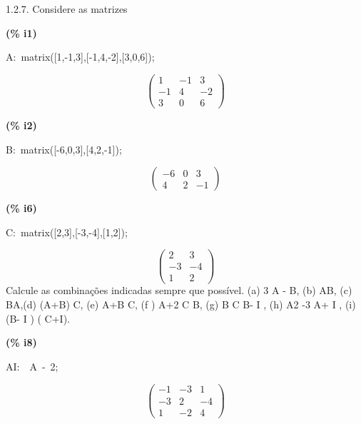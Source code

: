 \documentclass[fleqn]{article}
\begin{document}
1.2.7. Considere as matrizes


\noindent
\begin{minipage}[t]{4.000000em}\color{red}\bfseries
(\% i1)	
\end{minipage}
\begin{minipage}[t]{\textwidth}\color{blue}
A:\ matrix([1,-1,3],[-1,4,-2],[3,0,6]);
\end{minipage}
\[\displaystyle \tag{A} 
\begin{pmatrix}1 & \mathop{-}1 & 3\\
\mathop{-}1 & 4 & \mathop{-}2\\
3 & 0 & 6\end{pmatrix}\mbox{}
\]


\noindent
\begin{minipage}[t]{4.000000em}\color{red}\bfseries
(\% i2)	
\end{minipage}
\begin{minipage}[t]{\textwidth}\color{blue}
B:\ matrix([-6,0,3],[4,2,-1]);
\end{minipage}
\[\displaystyle \tag{B} 
\begin{pmatrix}\mathop{-}6 & 0 & 3\\
4 & 2 & \mathop{-}1\end{pmatrix}\mbox{}
\]


\noindent
\begin{minipage}[t]{4.000000em}\color{red}\bfseries
(\% i6)	
\end{minipage}
\begin{minipage}[t]{\textwidth}\color{blue}
C:\ matrix([2,3],[-3,-4],[1,2]);
\end{minipage}
\[\displaystyle \tag{C} 
\begin{pmatrix}2 & 3\\
\mathop{-}3 & \mathop{-}4\\
1 & 2\end{pmatrix}\mbox{}
\]
Calcule as combinações indicadas sempre que possível. (a) 3 A - B, (b) AB, (c) BA,(d) (A+B) C, (e) A+B C, (f ) A+2 C B, (g) B C B- I , (h) A2 -3 A+ I , (i) (B- I ) ( C+I).


\noindent
\begin{minipage}[t]{4.000000em}\color{red}\bfseries
(\% i8)	
\end{minipage}
\begin{minipage}[t]{\textwidth}\color{blue}
AI:\ \ A\ -\ 2;
\end{minipage}
\[\displaystyle \tag{AI} 
\begin{pmatrix}\mathop{-}1 & \mathop{-}3 & 1\\
\mathop{-}3 & 2 & \mathop{-}4\\
1 & \mathop{-}2 & 4\end{pmatrix}\mbox{}
\]
\end{document}
